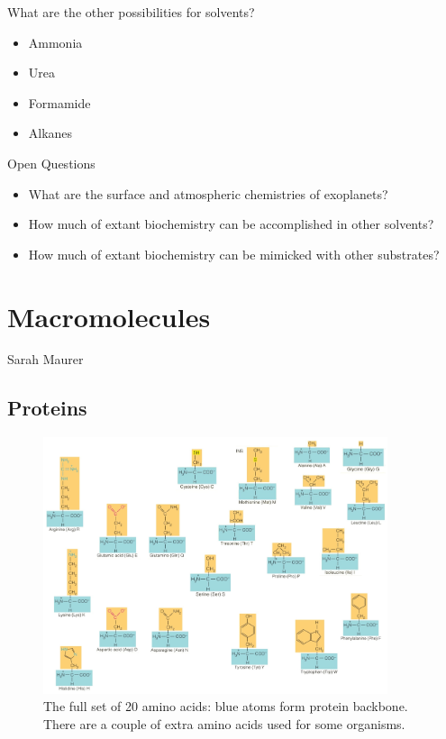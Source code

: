 \documentclass[]{article}
\begin{document}
What are the other possibilities for solvents?
\begin{itemize}
	\item Ammonia
	\item Urea
	\item Formamide
	\item Alkanes
\end{itemize}

Open Questions
\begin{itemize}
	\item What are the surface and atmospheric chemistries of
	exoplanets?
	\item How much of extant biochemistry can be accomplished
	in other solvents?
	\item How much of extant biochemistry can be mimicked with
	other substrates?
\end{itemize}
\section{Macromolecules}

Sarah Maurer

\subsection{Proteins}

\cite[25.9 Proteins]{brown2009chemistry}

\begin{figure}[H]
	\caption[The full set of 20 amino acids]{The full set of 20 amino acids: blue atoms form protein backbone. There are a couple of extra amino acids used for some organisms.}\label{fig:AminoAcids} 
	\includegraphics[width=0.9\textwidth]{AminoAcids}
\end{figure}
\end{document}

